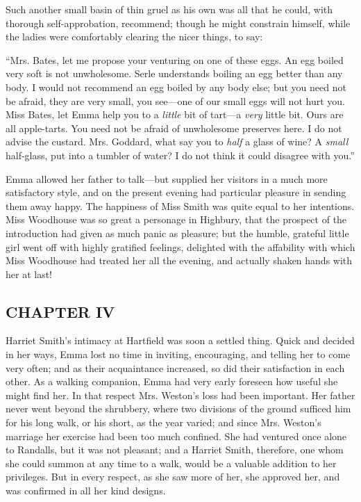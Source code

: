 Such another small basin of thin gruel as his own was all that he could, with thorough self-approbation, recommend; though he might constrain himself, while the ladies were comfortably clearing the nicer things, to say:

“Mrs. Bates, let me propose your venturing on one of these eggs. An egg boiled very soft is not unwholesome. Serle understands boiling an egg better than any body. I would not recommend an egg boiled by any body else; but you need not be afraid, they are very small, you see---one of our small eggs will not hurt you. Miss Bates, let Emma help you to a {\em little} bit of tart---a {\em very} little bit. Ours are all apple-tarts. You need not be afraid of unwholesome preserves here. I do not advise the custard. Mrs. Goddard, what say you to {\em half} a glass of wine? A {\em small} half-glass, put into a tumbler of water? I do not think it could disagree with you.”

Emma allowed her father to talk---but supplied her visitors in a much more satisfactory style, and on the present evening had particular pleasure in sending them away happy. The happiness of Miss Smith was quite equal to her intentions. Miss Woodhouse was so great a personage in Highbury, that the prospect of the introduction had given as much panic as pleasure; but the humble, grateful little girl went off with highly gratified feelings, delighted with the affability with which Miss Woodhouse had treated her all the evening, and actually shaken hands with her at last!

\subsection[chapter-iv]{\useURL[url4][][][]\from[url4]CHAPTER IV}

Harriet Smith's intimacy at Hartfield was soon a settled thing. Quick and decided in her ways, Emma lost no time in inviting, encouraging, and telling her to come very often; and as their acquaintance increased, so did their satisfaction in each other. As a walking companion, Emma had very early foreseen how useful she might find her. In that respect Mrs. Weston's loss had been important. Her father never went beyond the shrubbery, where two divisions of the ground sufficed him for his long walk, or his short, as the year varied; and since Mrs. Weston's marriage her exercise had been too much confined. She had ventured once alone to Randalls, but it was not pleasant; and a Harriet Smith, therefore, one whom she could summon at any time to a walk, would be a valuable addition to her privileges. But in every respect, as she saw more of her, she approved her, and was confirmed in all her kind designs.

